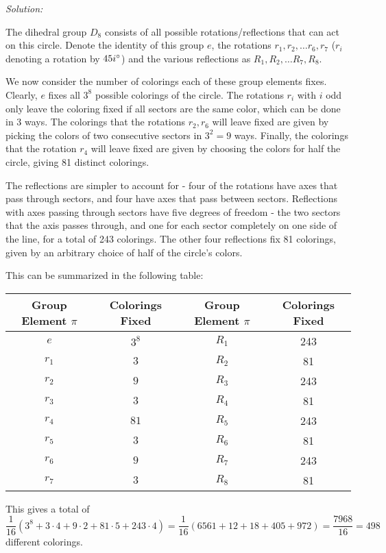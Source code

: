 \documentclass[12pt]{scrartcl}
\newenvironment{solution}
    {\emph{Solution:}
    }
    {
    \qedhere
    }
\begin{document}
\begin{solution}
The dihedral group $D_8$ consists of all possible rotations/reflections that can act on this circle. Denote the identity of this group $e$, the rotations $r_1, r_2, \ldots r_6, r_7$ ($r_i$ denoting a rotation by $45i^\circ$) and the various reflections as $R_1, R_2, \ldots R_7, R_8$. 

We now consider the number of colorings each of these group elements fixes. Clearly, $e$ fixes all $3^8$ possible colorings of the circle. The rotations $r_i$ with $i$ odd only leave the coloring fixed if all sectors are the same color, which can be done in 3 ways. The colorings that the rotations $r_2, r_6$ will leave fixed are given by picking the colors of two consecutive sectors in $3^2 = 9$ ways. Finally, the colorings that the rotation $r_4$ will leave fixed are given by choosing the colors for half the circle, giving 81 distinct colorings.

The reflections are simpler to account for - four of the rotations have axes that pass through sectors, and four have axes that pass between sectors. Reflections with axes passing through sectors have five degrees of freedom - the two sectors that the axis passes through, and one for each sector completely on one side of the line, for a total of 243 colorings. The other four reflections fix 81 colorings, given by an arbitrary choice of half of the circle's colors. 

This can be summarized in the following table: 
\begin{center}
\begin{tabular}{c | c | c | c }
Group Element $\pi$ & Colorings Fixed & Group Element $\pi$ & Colorings Fixed \\ \hline 
$e$ & $3^8$ & $R_1$ & 243 \\ 
$r_1$ & $3$ & $R_2$ & 81 \\ 
$r_2$ & $9$ & $R_3$ & 243 \\ 
$r_3$ & $3$ & $R_4$ & 81 \\ 
$r_4$ & $81$ & $R_5$ & 243 \\ 
$r_5$ & $3$ & $R_6$ & 81 \\ 
$r_6$ & $9$ & $R_7$ & 243 \\ 
$r_7$ & $3$ & $R_8$ & 81 \\ \hline 

\end{tabular}
\end{center}

This gives a total of 
\[
	\frac{1}{16}(3^8 + 3 \cdot 4 + 9 \cdot 2 + 81 \cdot 5 + 243 \cdot 4) = \frac{1}{16}(6561 + 12 + 18 + 405 + 972) = \frac{7968}{16} = \boxed{498}
\]
different colorings. 
\end{solution}
\end{document}
